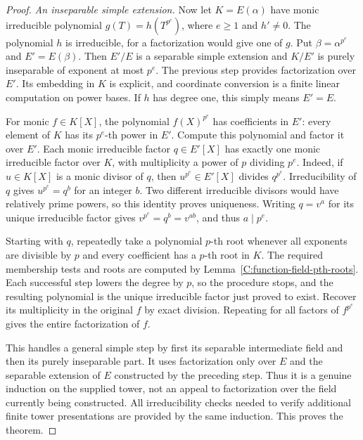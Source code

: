 \begin{proof}
\emph{An inseparable simple extension.}
Now let $K=E(\alpha)$ have monic irreducible polynomial
$g(T)=h(T^{p^e})$, where $e\geq1$ and $h'\ne0$.
The polynomial $h$ is irreducible, for a factorization
would give one of $g$. Put $\beta=\alpha^{p^e}$ and
$E'=E(\beta)$. Then $E'/E$ is a separable simple extension
and $K/E'$ is purely inseparable of exponent at most $p^e$.
The previous step provides factorization over $E'$.
Its embedding in $K$ is explicit, and coordinate
conversion is a finite linear computation on power bases.
If $h$ has degree one, this simply means $E'=E$.

For monic $f\in K[X]$, the polynomial $f(X)^{p^e}$ has
coefficients in $E'$: every element of $K$ has its
$p^e$-th power in $E'$. Compute this polynomial and
factor it over $E'$.
Each monic irreducible factor $q\in E'[X]$ has exactly
one monic irreducible factor over $K$, with multiplicity
a power of $p$ dividing $p^e$. Indeed, if $u\in K[X]$
is a monic divisor of $q$, then $u^{p^e}\in E'[X]$
divides $q^{p^e}$. Irreducibility of $q$ gives
$u^{p^e}=q^b$ for an integer $b$.
Two different irreducible divisors would have relatively
prime powers, so this identity proves uniqueness.
Writing $q=v^a$ for its unique irreducible factor gives
$v^{p^e}=q^b=v^{ab}$, and thus $a\mid p^e$.

Starting with $q$, repeatedly take a polynomial $p$-th
root whenever all exponents are divisible by $p$ and
every coefficient has a $p$-th root in $K$.
The required membership tests and roots are computed
by Lemma~\ref{C:function-field-pth-roots}.
Each successful step lowers the degree by $p$, so the
procedure stops, and the resulting polynomial is
the unique irreducible factor just proved to exist.
Recover its multiplicity in the original $f$ by exact
division. Repeating for all factors of $f^{p^e}$ gives
the entire factorization of $f$.

This handles a general simple step by first its separable
intermediate field and then its purely inseparable part.
It uses factorization only over $E$ and the separable
extension of $E$ constructed by the preceding step.
Thus it is a genuine induction on the supplied tower,
not an appeal to factorization over the field currently
being constructed. All irreducibility checks needed
to verify additional finite tower presentations are
provided by the same induction. This proves the theorem.
\end{proof}

